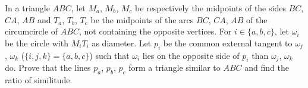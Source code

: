 In a triangle $ABC$, let $M_a$, $M_b$, $M_c$ be respectively the midpoints of the sides $BC$, $CA$, $AB$ and $T_a$, $T_b$, $T_c$ be the midpoints of the arcs $BC$, $CA$, $AB$ of the circumcircle of $ABC$, not containing the opposite vertices. For $i \in \{a, b, c\}$, let $\omega_i$ be the circle with $M_i T_i$ as diameter. Let $p_i$ be the common external tangent to $\omega_j$, $\omega_k$ ($\{i, j, k\} = \{a, b, c\}$) such that $\omega_i$ lies on the opposite side of $p_i$ than $\omega_j$, $\omega_k$ do. Prove that the lines $p_a$, $p_b$, $p_c$ form a triangle similar to $ABC$ and find the ratio of similitude.
